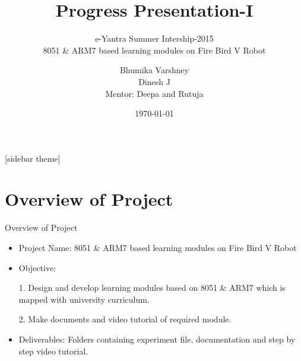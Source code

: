 \documentclass[10pt, a4paper]{beamer}
\begin{document}
	\title{Progress Presentation-I}
	\subtitle{e-Yantra Summer Intership-2015 \\ 8051 \& ARM7 based learning modules on Fire Bird V Robot}
	\author{Bhumika Varshney\\  Dinesh J\\
		Mentor: Deepa and Rutuja}
	\date{\today}
	\frame{\titlepage}

[sidebar theme]
\section{Overview of Project}
\begin{frame}{Overview of Project}

	\begin{itemize}
		\item Project Name: 8051 \& ARM7 based learning modules on Fire Bird V Robot 
		\newline
		 \vspace{0.1cm}
		\item Objective: 
		
		1. Design and develop learning modules based on 8051 \& ARM7 which is mapped with university curriculum.
		
		2. Make documents and video tutorial of required module.\newline
		 \vspace{0.1cm}
		
		\item Deliverables: Folders containing experiment file, documentation and step by step video tutorial.
	\end{itemize}
\end{frame}
\end{document}

